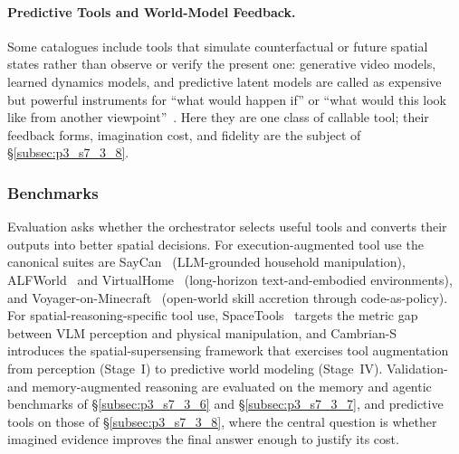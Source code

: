 \paragraph{Predictive Tools and World-Model Feedback.}
Some catalogues include tools that simulate counterfactual or future spatial states rather than observe or verify the present one: generative video models, learned dynamics models, and predictive latent models are called as expensive but powerful instruments for ``what would happen if'' or ``what would this look like from another viewpoint''~\cite{liu2022mindseye,yang2025cambrians}.
Here they are one class of callable tool; their feedback forms, imagination cost, and fidelity are the subject of §\ref{subsec:p3_s7_3_8}.


\subsubsection{Benchmarks}
Evaluation asks whether the orchestrator selects useful tools and converts their outputs into better spatial decisions.
For execution-augmented tool use the canonical suites are SayCan~\cite{ahn2022icanisay} (LLM-grounded household manipulation), ALFWorld~\cite{shridhar2020alfworld} and VirtualHome~\cite{puig2018virtualhome} (long-horizon text-and-embodied environments), and Voyager-on-Minecraft~\cite{wang2023voyager} (open-world skill accretion through code-as-policy).
For spatial-reasoning-specific tool use, SpaceTools~\cite{chen2025spacetools} targets the metric gap between VLM perception and physical manipulation, and Cambrian-S~\cite{yang2025cambrians} introduces the spatial-supersensing framework that exercises tool augmentation from perception (Stage~I) to predictive world modeling (Stage~IV).
Validation- and memory-augmented reasoning are evaluated on the memory and agentic benchmarks of §\ref{subsec:p3_s7_3_6} and §\ref{subsec:p3_s7_3_7}, and predictive tools on those of §\ref{subsec:p3_s7_3_8}, where the central question is whether imagined evidence improves the final answer enough to justify its cost.


